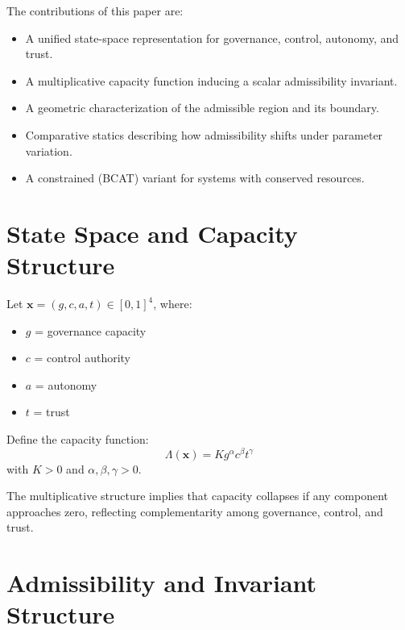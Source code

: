 \documentclass[letterpaper, 10 pt, conference]{ieeeconf}
\begin{document}
The contributions of this paper are:
\begin{itemize}
\item A unified state-space representation for governance, control, autonomy, and trust.
\item A multiplicative capacity function inducing a scalar admissibility invariant.
\item A geometric characterization of the admissible region and its boundary.
\item Comparative statics describing how admissibility shifts under parameter variation.
\item A constrained (BCAT) variant for systems with conserved resources.
\end{itemize}

\section{State Space and Capacity Structure}

\begin{definition}
Let $\mathbf{x} = (g,c,a,t) \in [0,1]^4$, where:
\begin{itemize}
\item $g$ = governance capacity
\item $c$ = control authority
\item $a$ = autonomy
\item $t$ = trust
\end{itemize}
\end{definition}

\begin{definition}
Define the capacity function:
\begin{equation}
\Lambda(\mathbf{x}) = K g^\alpha c^\beta t^\gamma
\end{equation}
with $K > 0$ and $\alpha,\beta,\gamma > 0$.
\end{definition}

The multiplicative structure implies that capacity collapses if any component approaches zero, reflecting complementarity among governance, control, and trust.

\section{Admissibility and Invariant Structure}
\end{document}
